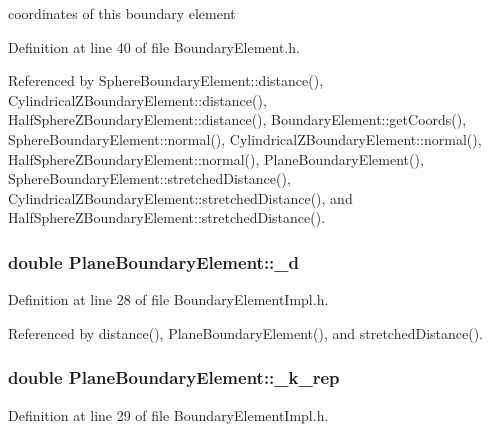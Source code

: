 coordinates of this boundary element 



Definition at line 40 of file Boundary\+Element.\+h.



Referenced by Sphere\+Boundary\+Element\+::distance(), Cylindrical\+Z\+Boundary\+Element\+::distance(), Half\+Sphere\+Z\+Boundary\+Element\+::distance(), Boundary\+Element\+::get\+Coords(), Sphere\+Boundary\+Element\+::normal(), Cylindrical\+Z\+Boundary\+Element\+::normal(), Half\+Sphere\+Z\+Boundary\+Element\+::normal(), Plane\+Boundary\+Element(), Sphere\+Boundary\+Element\+::stretched\+Distance(), Cylindrical\+Z\+Boundary\+Element\+::stretched\+Distance(), and Half\+Sphere\+Z\+Boundary\+Element\+::stretched\+Distance().

\hypertarget{classPlaneBoundaryElement_a01c1e54fda120dba72c8cea1b3025ab7}{
\subsubsection[{\+\_\+d}]{\setlength{\rightskip}{0pt plus 5cm}double Plane\+Boundary\+Element\+::\+\_\+d\hspace{0.3cm}{\ttfamily [private]}}}\label{classPlaneBoundaryElement_a01c1e54fda120dba72c8cea1b3025ab7}


Definition at line 28 of file Boundary\+Element\+Impl.\+h.



Referenced by distance(), Plane\+Boundary\+Element(), and stretched\+Distance().

\hypertarget{classPlaneBoundaryElement_aaa66079ea34844957907160081ab3059}{
\subsubsection[{\+\_\+k\+\_\+rep}]{\setlength{\rightskip}{0pt plus 5cm}double Plane\+Boundary\+Element\+::\+\_\+k\+\_\+rep\hspace{0.3cm}{\ttfamily [private]}}}\label{classPlaneBoundaryElement_aaa66079ea34844957907160081ab3059}


Definition at line 29 of file Boundary\+Element\+Impl.\+h.



